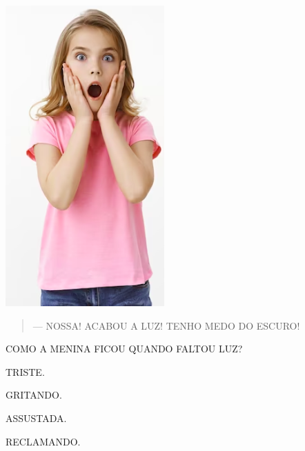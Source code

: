 \begin{minipage}{.3\textwidth}
\includegraphics[width=\textwidth]{media/image205.png}
\end{minipage}
\begin{minipage}{.7\textwidth}
\begin{quote}
— NOSSA! ACABOU A LUZ! TENHO MEDO DO ESCURO!
\end{quote}

COMO A MENINA FICOU QUANDO FALTOU LUZ?

\begin{escolha}
\item TRISTE.

\item GRITANDO.

\item ASSUSTADA.

\item RECLAMANDO.
\end{escolha}
\end{minipage}

